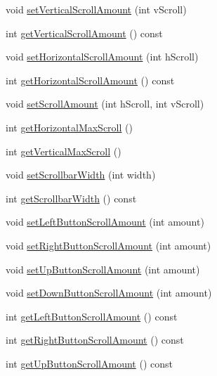 \begin{DoxyCompactItemize}
\item 
void \hyperlink{classgcn_1_1ScrollArea_a496ac9dbfef2158c273e061691be4479}{set\+Vertical\+Scroll\+Amount} (int v\+Scroll)
\item 
int \hyperlink{classgcn_1_1ScrollArea_a708667b17764ebd6821eab76e5e55b1a}{get\+Vertical\+Scroll\+Amount} () const 
\item 
void \hyperlink{classgcn_1_1ScrollArea_a1ed5ae16d3368047106e2fc94cd7f1b4}{set\+Horizontal\+Scroll\+Amount} (int h\+Scroll)
\item 
int \hyperlink{classgcn_1_1ScrollArea_ad2bcda3abd9ba907b52cd7eaf01a700e}{get\+Horizontal\+Scroll\+Amount} () const 
\item 
void \hyperlink{classgcn_1_1ScrollArea_a5d81b945c75ea165faf0052bacf713e8}{set\+Scroll\+Amount} (int h\+Scroll, int v\+Scroll)
\item 
int \hyperlink{classgcn_1_1ScrollArea_a75d37345aa411f61b689c4c6015cfb39}{get\+Horizontal\+Max\+Scroll} ()
\item 
int \hyperlink{classgcn_1_1ScrollArea_ab0fbcb3b56689715cc02f90e73ecea1f}{get\+Vertical\+Max\+Scroll} ()
\item 
void \hyperlink{classgcn_1_1ScrollArea_ae7685ceba9098d57c87f35a1629c4a86}{set\+Scrollbar\+Width} (int width)
\item 
int \hyperlink{classgcn_1_1ScrollArea_a47c1efc3531bd3a6b2701dd0177a8a8d}{get\+Scrollbar\+Width} () const 
\item 
void \hyperlink{classgcn_1_1ScrollArea_aaf9c4114be85f3d7f36227623e6fb68d}{set\+Left\+Button\+Scroll\+Amount} (int amount)
\item 
void \hyperlink{classgcn_1_1ScrollArea_ad371bc55196477cc9755a24fae6307c3}{set\+Right\+Button\+Scroll\+Amount} (int amount)
\item 
void \hyperlink{classgcn_1_1ScrollArea_ab6b9fe3f50e252858d386eba0b027af4}{set\+Up\+Button\+Scroll\+Amount} (int amount)
\item 
void \hyperlink{classgcn_1_1ScrollArea_ab14d11948ec760c168fe76bf00fdcde1}{set\+Down\+Button\+Scroll\+Amount} (int amount)
\item 
int \hyperlink{classgcn_1_1ScrollArea_a31b754791e1815454838b69906bfb6b0}{get\+Left\+Button\+Scroll\+Amount} () const 
\item 
int \hyperlink{classgcn_1_1ScrollArea_a178696ab274df5da9357ab8a9a5879e7}{get\+Right\+Button\+Scroll\+Amount} () const 
\item 
int \hyperlink{classgcn_1_1ScrollArea_a896c03b8c4bedcb1129b3f6f8d3fb250}{get\+Up\+Button\+Scroll\+Amount} () const 

\end{DoxyCompactItemize}
